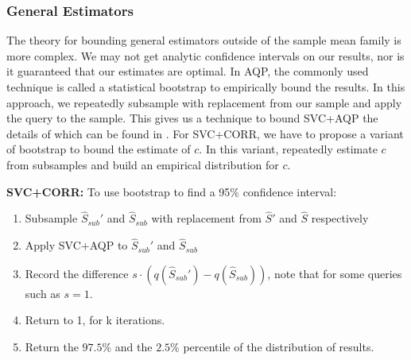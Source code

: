 \subsubsection{General Estimators}
The theory for bounding general estimators outside of the sample mean family is more complex.
We may not get analytic confidence intervals on our results, nor is it guaranteed that our estimates are optimal.
In AQP, the commonly used technique is called a statistical bootstrap \cite{AgarwalMPMMS13} to empirically bound the results.
In this approach, we repeatedly subsample with replacement from our sample and apply the query to the sample.
This gives us a technique to bound SVC+AQP the details of which can be found in \cite{AgarwalMPMMS13, agarwalknowing, DBLP:conf/sigmod/ZengGMZ14}. 
For SVC+CORR, we have to propose a variant of bootstrap to bound the estimate of $c$.
In this variant, repeatedly estimate $c$ from subsamples and build an empirical distribution for $c$.

\vspace{0.35em}

\noindent\textbf{SVC+CORR: } To use bootstrap to find a 95\% confidence interval:
\begin{enumerate}[noitemsep]
\item Subsample $\widehat{S}_{sub}'$ and $\widehat{S}_{sub}$ with replacement from $\widehat{S}'$ and $\widehat{S}$ respectively
\item Apply SVC+AQP to $\widehat{S}_{sub}'$ and $\widehat{S}_{sub}$
\item Record the difference $s\cdot(q(\widehat{S}_{sub}')-q(\widehat{S}_{sub}))$, note that for some queries such as \medfunc $s=1$.
\item Return to 1, for k iterations.
\item Return the $97.5$\% and the $2.5$\% percentile of the distribution of results. 
\end{enumerate}

\iffalse
